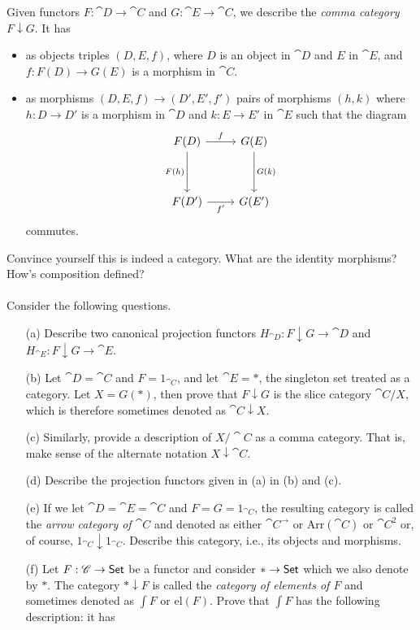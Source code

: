 \vspace{0.1in}

\begin{problem}\label{prob 5.7}
Given functors $F:\cat{D} \to \cat{C}$ and $G: \cat{E} \to \cat{C}$, we describe the \emph{comma category $F\downarrow G$}. It has
\begin{itemize}
\item as objects triples $(D,E,f)$, where $D$ is an object in $\cat{D}$ and $E$ in $\cat{E}$, and $f:F(D) \to G(E)$ is a morphism in $\cat{C}$.
\item as morphisms $(D,E,f) \to (D',E',f')$ pairs of morphisms $(h,k)$ where $h:D \to D'$ is a morphism in $\cat{D}$ and $k: E \to E'$ in $\cat{E}$ such that the diagram
\[\begin{tikzcd}[row sep=huge]
{F(D)} \arrow[d, "F(h)"'] \arrow[r, "f"] & G(E) \arrow[d, "G(k)"] \\
{F(D')} \arrow[r, "f'"']                       & G(E')                 
\end{tikzcd}\]
commutes.
\end{itemize}
Convince yourself this is indeed a category. What are the identity morphisms? How's composition defined?\\
\\
Consider the following questions.
\begin{itemize}
\item[(a)] Describe two canonical projection functors $H_{\cat{D}}:F\downarrow G \to \cat{D}$ and $H_{\cat{E}}:F\downarrow G \to \cat{E}$.
\item[(b)] Let $\cat{D} = \cat{C}$ and $F = 1_{\cat{C}}$, and let $\cat{E} = *$, the singleton set treated as a category. Let $X = G(*)$, then prove that $F\downarrow G$ is the slice category $\cat{C}/X$, which is therefore sometimes denoted as $\cat{C}\downarrow X$.
\item[(c)] Similarly, provide a description of $X/\cat{C}$ as a comma category. That is, make sense of the alternate notation $X \downarrow \cat{C}$.
\item[(d)] Describe the projection functors given in (a) in (b) and (c).
\item[(e)] If we let $\cat{D} = \cat{E} = \cat{C}$ and $F = G = 1_{\cat{C}}$, the resulting category is called the \emph{arrow category of $\cat{C}$} and denoted as either $\cat{C}^{\to}$ or $\mathrm{Arr}(\cat{C})$ or $\cat{C}^2$ or, of course, $1_{\cat{C}}\downarrow 1_{\cat{C}}$. Describe this category, i.e., its objects and morphisms. 
\item[(f)] Let $F: \mathscr{C} \to \mathsf{Set}$ be a functor and consider $* \to \mathsf{Set}$ which we also denote by $*$. The category $*\downarrow F$ is called the \emph{category of elements of $F$} and sometimes denoted as $\int F$ or $\mathrm{el}(F)$. Prove that $\int F$ has the following description: it has

\end{itemize}
\end{problem}
